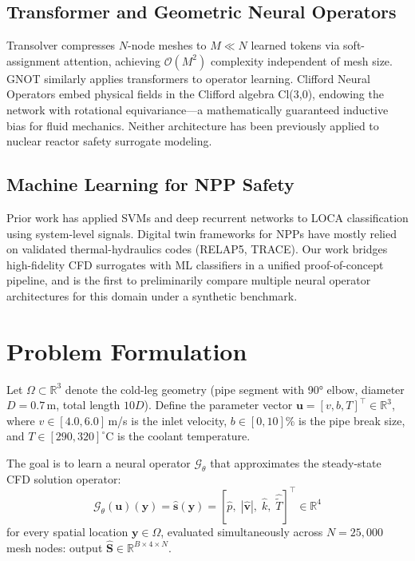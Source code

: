 \documentclass[conference]{IEEEtran}
\begin{document}
\subsection{Transformer and Geometric Neural Operators}
Transolver \cite{wu2024transolver} compresses $N$-node meshes to $M \ll N$ learned tokens via soft-assignment attention, achieving $\mathcal{O}(M^2)$ complexity independent of mesh size. GNOT \cite{hao2023gnot} similarly applies transformers to operator learning. Clifford Neural Operators \cite{brandstetter2023clifford} embed physical fields in the Clifford algebra Cl(3,0), endowing the network with rotational equivariance---a mathematically guaranteed inductive bias for fluid mechanics. Neither architecture has been previously applied to nuclear reactor safety surrogate modeling.

\subsection{Machine Learning for NPP Safety}
Prior work has applied SVMs \cite{song2018} and deep recurrent networks \cite{choi2019} to LOCA classification using system-level signals. Digital twin frameworks for NPPs \cite{grieves2014, liu2022npp} have mostly relied on validated thermal-hydraulics codes (RELAP5, TRACE). Our work bridges high-fidelity CFD surrogates with ML classifiers in a unified proof-of-concept pipeline, and is the first to preliminarily compare multiple neural operator architectures for this domain under a synthetic benchmark.

\section{Problem Formulation}
\label{sec:problem}

Let $\Omega \subset \mathbb{R}^3$ denote the cold-leg geometry (pipe segment with 90° elbow, diameter $D = 0.7$\,m, total length $10D$). Define the parameter vector $\bm{u} = [v, b, T]^\top \in \mathbb{R}^3$, where $v \in [4.0, 6.0]$\,m/s is the inlet velocity, $b \in [0, 10]$\% is the pipe break size, and $T \in [290, 320]^\circ$C is the coolant temperature.

The goal is to learn a neural operator $\mathcal{G}_\theta$ that approximates the steady-state CFD solution operator:
\begin{equation}
\mathcal{G}_\theta(\bm{u})(\bm{y}) = \hat{\bm{s}}(\bm{y}) = [\hat{p},\; |\hat{\bm{v}}|,\; \hat{k},\; \hat{\tilde{T}}]^\top \in \mathbb{R}^4
\label{eq:operator}
\end{equation}
for every spatial location $\bm{y} \in \Omega$, evaluated simultaneously across $N = 25{,}000$ mesh nodes: output $\hat{\bm{S}} \in \mathbb{R}^{B \times 4 \times N}$.
\end{document}
